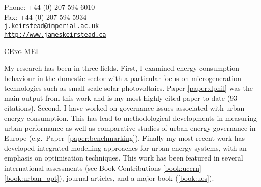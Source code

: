 \documentclass[11pt,a4paper]{article}
\date{} %
\makeatletter
\def\myemail{j.keirstead@imperial.ac.uk}
\def\myweb{http://www.jameskeirstead.ca}
\def\myphone{+44 (0) 207 594 6010}
\def\myfax{+44 (0) 207 594 5934}
\newcommand{\marginhead}[1]{\marginpar{\textsf{{\footnotesize #1}}}}
\makeatother
\begin{document}
\thispagestyle{plain}

\begin{minipage}[t]{2.95in}
\end{minipage}
\hfill     
\hfill
\begin{minipage}[t]{1.7in}
  \flushright \footnotesize Phone: \myphone \\ 
  Fax: \myfax  \\ 
  {\scriptsize  \texttt{\href{mailto:\myemail}{\myemail}}} \\
  {\scriptsize  \texttt{\href{\myweb}{\myweb}}}
\end{minipage}


\bigskip

\bigskip

 {\scriptsize \textsc{CEng MEI}}
\reversemarginpar

\bigskip

\bigskip



\bigskip

\noindent\marginhead{Statement of\\Significance}%
My research has been in three fields.  First, I examined energy consumption behaviour in the domestic sector  with a particular focus on microgeneration technologies such as small-scale solar photovoltaics.  Paper \ref{paper:dphil} was the main output from this work and is my most highly cited paper to date (93 citations).  Second, I have worked on governance issues associated with urban energy consumption.  This has lead to methodological developments in measuring urban performance as well as comparative studies of urban energy governance in Europe (e.g.\ Paper~\ref{paper:benchmarking}).  Finally my most recent work has developed integrated modelling approaches for urban energy systems, with an emphasis on optimisation techniques.  This work has been featured in several international assessments (see Book Contributions \ref{book:uccrn}--\ref{book:urban_opt}), journal articles, and a major book (\ref{book:ues}). 
\end{document}
